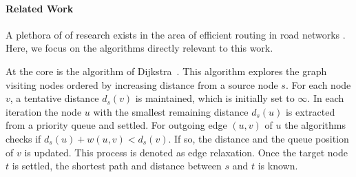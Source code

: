 \documentclass[a4paper,UKenglish,cleveref, autoref]{lipics-v2019}
\begin{document}

\paragraph*{Related Work}





A plethora of of research exists in the area of efficient routing in road networks \cite{bdgmpsww-rptn-16}.
Here, we focus on the algorithms directly relevant to this work.

At the core is the algorithm of Dijkstra~\cite{d-ntpcg-59}.
This algorithm explores the graph visiting nodes ordered by increasing distance from a source node $s$.
For each node $v$, a tentative distance $d_s(v)$ is maintained, which is initially set to $\infty$.
In each iteration the node $u$ with the smallest remaining distance $d_s(u)$ is extracted from a priority queue and settled.
For outgoing edge $(u,v)$ of $u$ the algorithms checks if $d_s(u) + w(u,v) < d_s(v)$.
If so, the distance and the queue position of $v$ is updated.
This process is denoted as edge relaxation.
Once the target node $t$ is settled, the shortest path and distance between $s$ and $t$ is known.
\end{document}
